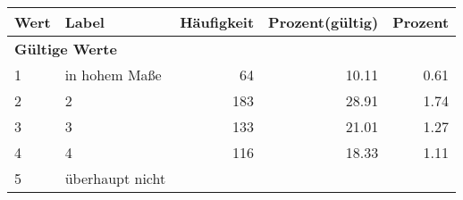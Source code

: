      \begin{longtable}{lXrrr}
     \toprule
     \textbf{Wert} & \textbf{Label} & \textbf{Häufigkeit} & \textbf{Prozent(gültig)} & \textbf{Prozent} \\
     \endhead
     \midrule
     \multicolumn{5}{l}{\textbf{Gültige Werte}}\\

     1 &
     \multicolumn{1}{X}{ in hohem Maße   } &


       \num{64} &
       \num[round-mode=places,round-precision=2]{10,11} &
         \num[round-mode=places,round-precision=2]{0,61} \\

     2 &
     \multicolumn{1}{X}{ 2   } &


       \num{183} &
       \num[round-mode=places,round-precision=2]{28,91} &
         \num[round-mode=places,round-precision=2]{1,74} \\

     3 &
     \multicolumn{1}{X}{ 3   } &


       \num{133} &
       \num[round-mode=places,round-precision=2]{21,01} &
         \num[round-mode=places,round-precision=2]{1,27} \\

     4 &
     \multicolumn{1}{X}{ 4   } &


       \num{116} &
       \num[round-mode=places,round-precision=2]{18,33} &
         \num[round-mode=places,round-precision=2]{1,11} \\

     5 &
     \multicolumn{1}{X}{ überhaupt nicht   } &



\end{longtable}
